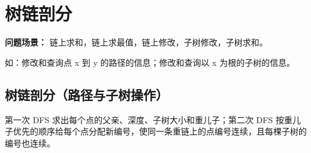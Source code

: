 \section{树链剖分}

\par \noindent \textbf{问题场景：} 链上求和，链上求最值，链上修改，子树修改，子树求和。
~\\
\par \noindent 如：修改和查询点 x 到 y 的路径的信息；修改和查询以 x 为根的子树的信息。

\subsection{树链剖分（路径与子树操作）}

\par \noindent 第一次 DFS 求出每个点的父亲、深度、子树大小和重儿子；第二次 DFS 按重儿子优先的顺序给每个点分配新编号，使同一条重链上的点编号连续，且每棵子树的编号也连续。

